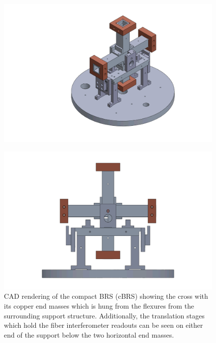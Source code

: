 \documentclass [12pt, proquest]{uwthesis}[2019]
\begin{document}
\begin{figure}%
\begin{center}
\includegraphics[width=\textwidth]{cBRSIso.png}
\end{center}
\end{figure}
\begin{figure}%
\begin{center}
 \includegraphics[width=\textwidth]{cBRSFront.png}
 
\caption{CAD rendering of the compact BRS (cBRS) showing the cross with its copper end masses which is hung from the flexures from the surrounding support structure. Additionally, the translation stages which hold the fiber interferometer readouts can be seen on either end of the support below the two horizontal end masses.}
\label{cBRS}
\end{center}
\end{figure}
\end{document}
